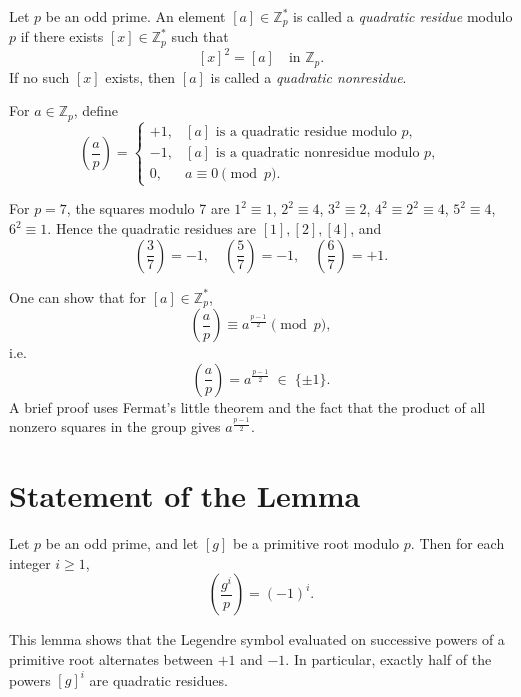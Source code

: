 \begin{definition}
Let $p$ be an odd prime.  An element $[a]\in\mathbb{Z}_p^*$ is called a \emph{quadratic residue} modulo $p$ if there exists $[x]\in\mathbb{Z}_p^*$ such that
$$[x]^2 = [a]\quad\text{in }\mathbb{Z}_p.$$
If no such $[x]$ exists, then $[a]$ is called a \emph{quadratic nonresidue}.
\end{definition}

\begin{definition}
For $a\in\mathbb{Z}_p$, define
$$
\left(\frac{a}{p}\right)
=\begin{cases}
+1,&[a]\text{ is a quadratic residue modulo }p,\\
-1,&[a]\text{ is a quadratic nonresidue modulo }p,\\
0,&a\equiv0\pmod p.
\end{cases}
$$
\end{definition}

\begin{example}
For $p=7$, the squares modulo 7 are $1^2\equiv1$, $2^2\equiv4$, $3^2\equiv2$, $4^2\equiv2^2\equiv4$, $5^2\equiv4$, $6^2\equiv1$.  Hence the quadratic residues are $[1],[2],[4]$, and
$$
\left(\frac{3}{7}\right)=-1,\quad\left(\frac{5}{7}\right)=-1,\quad\left(\frac{6}{7}\right)=+1.
$$
\end{example}

\begin{remark}
One can show that for $[a]\in\mathbb{Z}_p^*$,
$$
\left(\frac{a}{p}\right) \equiv a^{\frac{p-1}{2}} \pmod p,
$$
i.e.
$$
\left(\frac{a}{p}\right) = a^{\frac{p-1}{2}} \;\in\;\{\pm1\}.
$$
A brief proof uses Fermat's little theorem and the fact that the product of all nonzero squares in the group gives $a^{\frac{p-1}{2}}$.
\end{remark}

\section{Statement of the Lemma}

\begin{lemma}
Let $p$ be an odd prime, and let $[g]$ be a primitive root modulo $p$.  Then for each integer $i\ge1$,
\begin{equation}
\left(\frac{g^i}{p}\right) 
= (-1)^i.
\end{equation}
\end{lemma}

This lemma shows that the Legendre symbol evaluated on successive powers of a primitive root alternates between $+1$ and $-1$.  In particular, exactly half of the powers $[g]^i$ are quadratic residues.

